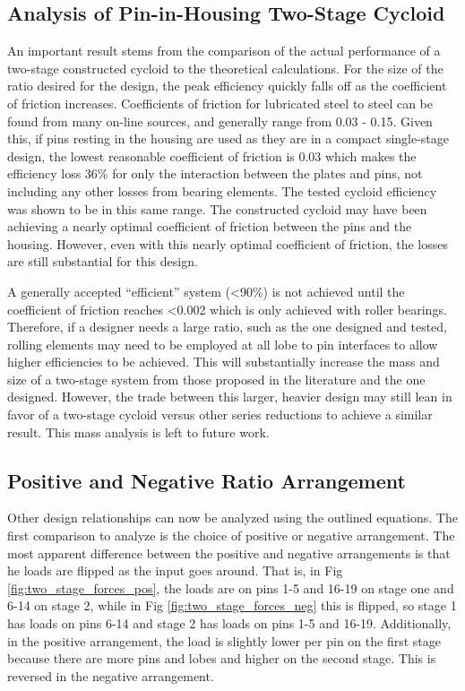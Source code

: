 \subsection{Analysis of Pin-in-Housing Two-Stage Cycloid} \label{ch:dual:discussion:actual}

An important result stems from the comparison of the actual performance of a two-stage constructed cycloid to the theoretical calculations. For the size of the ratio desired for the design, the peak efficiency quickly falls off as the coefficient of friction increases. Coefficients of friction for lubricated steel to steel can be found from many on-line sources, and generally range from 0.03 - 0.15. Given this, if pins resting in the housing are used as they are in a compact single-stage design, the lowest reasonable coefficient of friction is 0.03 which makes the efficiency loss 36\% for only the interaction between the plates and pins, not including any other losses from bearing elements. The tested cycloid efficiency was shown to be in this same range. The constructed cycloid may have been achieving a nearly optimal coefficient of friction between the pins and the housing. However, even with this nearly optimal coefficient of friction, the losses are still substantial for this design. 

A generally accepted ``efficient'' system (\textless90\%) is not achieved until the coefficient of friction reaches \textless0.002 which is only achieved with roller bearings. Therefore, if a designer needs a large ratio, such as the one designed and tested, rolling elements may need to be employed at all lobe to pin interfaces to allow higher efficiencies to be achieved. This will substantially increase the mass and size of a two-stage system from those proposed in the literature and the one designed. However, the trade between this larger, heavier design may still lean in favor of a two-stage cycloid versus other series reductions to achieve a similar result. This mass analysis is left to future work. 

\subsection{Positive and Negative Ratio Arrangement}\label{ch:dual:discussion:pos_neg}

Other design relationships can now be analyzed using the outlined equations. The first comparison to analyze is the choice of positive or negative arrangement. The most apparent difference between the positive and negative arrangements is that he loads are flipped as the input goes around. That is, in Fig \ref{fig:two_stage_forces_pos}, the loads are on pins 1-5 and 16-19 on stage one and 6-14 on stage 2, while in Fig \ref{fig:two_stage_forces_neg} this is flipped, so stage 1 has loads on pins 6-14 and stage 2 has loads on pins 1-5 and 16-19. Additionally, in the positive arrangement, the load is slightly lower per pin on the first stage because there are more pins and lobes and higher on the second stage. This is reversed in the negative arrangement. 

